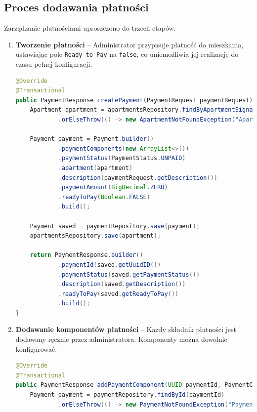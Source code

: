 \subsection{Proces dodawania płatności}
Zarządzanie płatnościami uproszczono do trzech etapów:
\begin{enumerate}
    \item \textbf{Tworzenie płatności} -- Administrator przypisuje płatność do mieszkania, ustawiając pole \texttt{Ready\_to\_Pay} na \texttt{false}, co uniemożliwia jej realizację do czasu pełnej konfiguracji. 
\begin{lstlisting}[language=Java, style=JavaStyle, caption=Fragment metody \texttt{createPayment}]
@Override
@Transactional
public PaymentResponse createPayment(PaymentRequest paymentRequest) throws ApartmentNotFoundException {
    Apartment apartment = apartmentsRepository.findByApartmentSignature(paymentRequest.getApartmentSignature())
            .orElseThrow(() -> new ApartmentNotFoundException("Apartment: " + paymentRequest.getApartmentSignature() + " not found"));

    Payment payment = Payment.builder()
            .paymentComponents(new ArrayList<>())
            .paymentStatus(PaymentStatus.UNPAID)
            .apartment(apartment)
            .description(paymentRequest.getDescription())
            .paymentAmount(BigDecimal.ZERO)
            .readyToPay(Boolean.FALSE)
            .build();

    Payment saved = paymentRepository.save(payment);
    apartmentsRepository.save(apartment);

    return PaymentResponse.builder()
            .paymentId(saved.getUuidID())
            .paymentStatus(saved.getPaymentStatus())
            .description(saved.getDescription())
            .readyToPay(saved.getReadyToPay())
            .build();
}
\end{lstlisting}

    \item \textbf{Dodawanie komponentów płatności} -- Każdy składnik płatności jest dodawany ręcznie przez administratora. Komponenty można dowolnie konfigurować.
   
\begin{lstlisting}[language=Java, style=JavaStyle, caption=Fragment metody \texttt{addPaymentComponent}]
@Override
@Transactional
public PaymentResponse addPaymentComponent(UUID paymentId, PaymentComponentRequest paymentComponentRequest) throws PaymentNotFoundException {
    Payment payment = paymentRepository.findById(paymentId)
            .orElseThrow(() -> new PaymentNotFoundException("Payment: " + paymentId + " not found"));


\end{lstlisting}
\end{enumerate}
